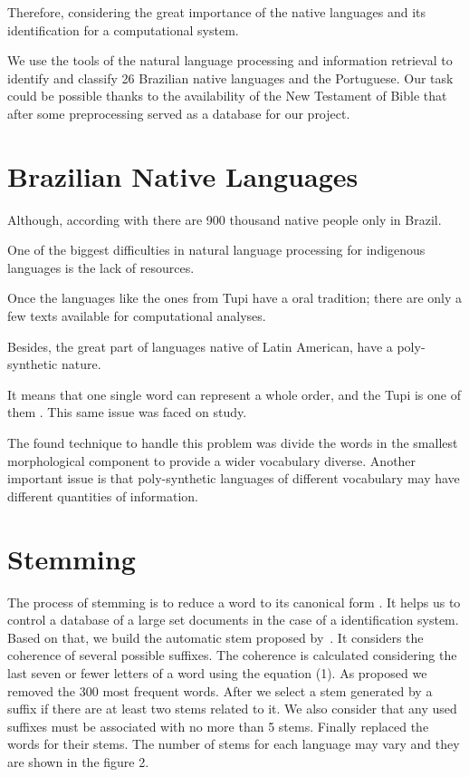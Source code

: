 \documentclass[12pt]{article}
\begin{document}
Therefore, considering the great importance of the native languages and its identification for a computational system.

We use the tools of the natural language processing and information retrieval to identify and classify 26 Brazilian native languages and the Portuguese.
Our task could be possible thanks to the availability of the New Testament of Bible that after some preprocessing served as a database for our project.

\section{Brazilian Native Languages} \label{sec:firstpage}
 Although, according with \cite{povos_indigenas} there are 900 thousand native people only in Brazil.

One of the biggest difficulties in natural language processing for indigenous languages is the lack of resources.

Once the languages like the ones from Tupi have a oral tradition;
there are only a few texts available for computational analyses.

Besides, the great part of languages native of Latin American, have a poly-synthetic nature.

It means that one single word can represent a whole order, and the Tupi is one of them \cite{lemos1956tupi}.
This same issue was faced on \cite{DBLP:journals/corr/abs-1804-06024} study.

The found technique to handle this problem was divide the words in the smallest morphological component to provide a wider vocabulary diverse.
Another important issue is that poly-synthetic languages of different vocabulary may have different quantities of information.


\section{Stemming}\label{sec:stemming}

The process of stemming is to reduce a word to its canonical form \cite{Goldsmith:2000:ALS:648263.753378}.
It helps us to control a database of a large set documents in the case of a identification system\cite{Goldsmith:2000:ALS:648263.753378}.
Based on that, we build the automatic stem proposed by~\cite{Goldsmith:2000:ALS:648263}.
It considers the coherence of several possible suffixes.
The coherence is calculated considering the last seven or fewer letters of a word using the equation (1).
As proposed we removed the 300 most frequent words.
After we select a stem generated by a suffix if there are at least two stems related to it.
We also consider that any used suffixes must be associated with no more than 5 stems.
Finally replaced the words for their stems.
The number of stems for each language may vary and they are shown in the figure 2.
\end{document}
